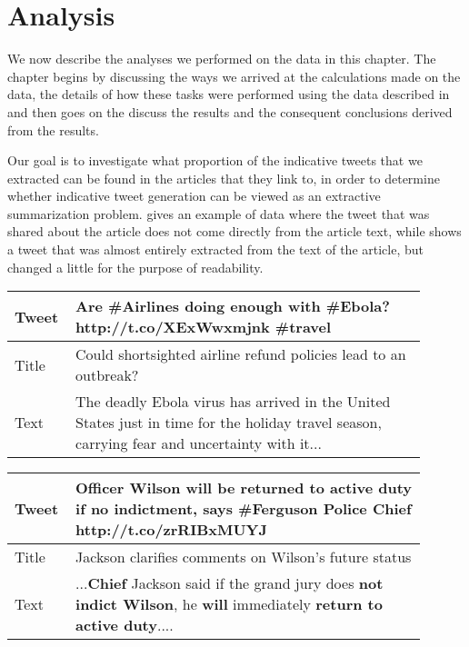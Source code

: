 \chapter{Analysis}
\label{chap:analysis}

We now describe the analyses we performed on the data in this chapter. The chapter begins by discussing the ways we arrived at the calculations made on the data, the details of how these tasks were performed using the data described in  and then goes on the discuss the results and the consequent conclusions derived from the results.

Our goal is to investigate what proportion of the indicative tweets that we extracted can be found in the articles that they link to, in order to determine whether indicative tweet generation can be viewed as an extractive summarization problem.  gives an example of data where the tweet that was shared about the article does not come directly from the article text, while  shows a tweet that was almost entirely extracted from the text of the article, but changed a little for the purpose of readability.

\begin{table}[!htbp]
\centering
\begin{tabular}{|p{0.1\linewidth}|p{0.8\linewidth}|}
\hline
Tweet &  Are \#Airlines doing enough with \#Ebola? http://t.co/XExWwxmjnk \#travel \\ \hline
Title &  Could shortsighted airline refund policies lead to an outbreak? \\  \hline
Text  &  The deadly Ebola virus has arrived in the United States just in time for the holiday travel season, carrying fear and uncertainty with it... \\ \hline
\end{tabular}
\label{tab:noextract}
\end{table}

\begin{table}[!htbp]
\centering
\begin{tabular}{|p{0.1\linewidth}|p{0.8\linewidth}|}
\hline
Tweet & Officer \textbf{Wilson will be returned to active duty if no indictment}, says \#Ferguson Police \textbf{Chief} http://t.co/zrRIBxMUYJ  \\ \hline
Title & Jackson clarifies comments on Wilson's future status \\ \hline
Text  & ...\textbf{Chief} Jackson said if the grand jury does \textbf{not indict Wilson}, he \textbf{will} immediately \textbf{return to active duty}.... \\ \hline
\end{tabular}
\label{tab:extract}
\end{table}

